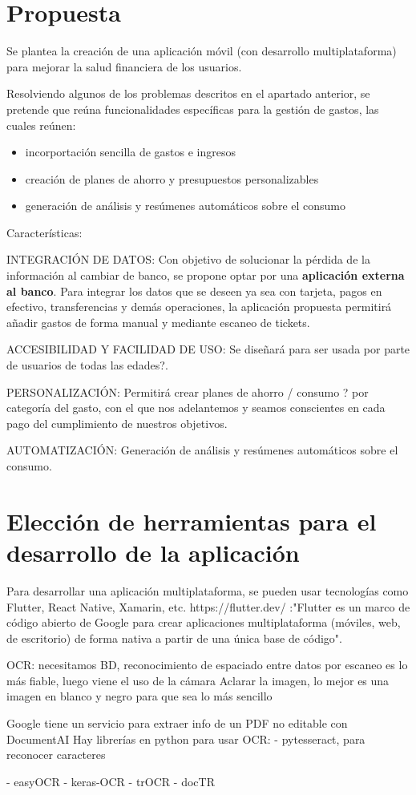 \section{Propuesta}
Se plantea la creación de una aplicación móvil (con desarrollo multiplataforma) 
para mejorar la salud financiera de los usuarios. 

Resolviendo algunos de los problemas descritos en el apartado anterior, 
se pretende que reúna funcionalidades específicas para la 
gestión de gastos, las cuales reúnen:
\begin{itemize}
\item incorportación sencilla de gastos e ingresos
\item creación de planes de ahorro y presupuestos personalizables
\item generación de análisis y resúmenes automáticos sobre el consumo
\end{itemize}


Características:

INTEGRACIÓN DE DATOS:
Con objetivo de solucionar la pérdida de la información al cambiar de banco, 
se propone optar por una \textbf{aplicación externa al banco}. 
Para integrar los datos que se deseen ya sea con tarjeta, pagos en efectivo, transferencias 
y demás operaciones, la aplicación propuesta permitirá añadir gastos de forma manual 
y mediante escaneo de tickets. 

ACCESIBILIDAD Y FACILIDAD DE USO:
Se diseñará para ser usada por parte de usuarios de todas las edades?.

PERSONALIZACIÓN: 
Permitirá crear planes de ahorro / consumo ? por categoría del gasto, con el que nos adelantemos y 
seamos conscientes en cada pago del cumplimiento de nuestros objetivos.

AUTOMATIZACIÓN:
Generación de análisis y resúmenes automáticos sobre el consumo.





\section{Elección de herramientas para el desarrollo de la aplicación}
Para desarrollar una aplicación multiplataforma, se pueden usar tecnologías como Flutter, React Native, Xamarin, etc.
https://flutter.dev/ :"Flutter es un marco de código abierto de Google para crear aplicaciones multiplataforma (móviles, 
web, de escritorio) de forma nativa a partir de una única base de código".


OCR:
necesitamos BD, reconocimiento de espaciado entre datos
por escaneo es lo más fiable, luego viene el uso de la cámara
Aclarar la imagen, lo mejor es una imagen en blanco y negro para que sea lo más sencillo

Google tiene un servicio para extraer info de un PDF no editable con DocumentAI
Hay librerías en python para usar OCR:
    - pytesseract, para reconocer caracteres 

- easyOCR
- keras-OCR
- trOCR
- docTR

